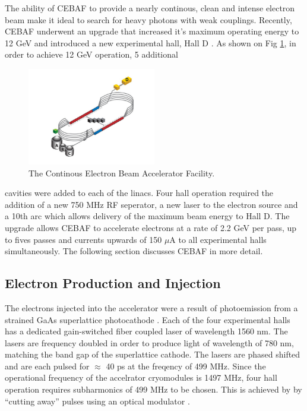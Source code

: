 The ability of CEBAF to provide a nearly continous, clean and intense electron
beam make it ideal to search for heavy photons with weak couplings. Recently,
CEBAF underwent an upgrade that increased it's maximum operating energy to 12
GeV and introduced a new experimental hall, Hall D \cite{pac.2007.4440339}. As 
shown on Fig \ref{fig:cebaf}, in order to achieve 12 GeV operation, 5 additional
\begin{figure}[h]
    \centering
    \includegraphics[width=0.5\textwidth]{images/cebaf.jpg}
    \caption{The Continous Electron Beam Accelerator Facility.}
    \label{fig:cebaf}
\end{figure}
cavities were added to each of the linacs.  Four hall operation required the 
addition of a new 750 MHz RF seperator, a new laser to the electron source and a
10th arc which allows delivery of the maximum beam energy to Hall D.  The 
upgrade allows CEBAF to accelerate electrons at a rate of 2.2 GeV per pass, up 
to fives passes and currents upwards of 150 $\mu$A to all experimental halls 
simultaneously.  The following section discusses CEBAF in more detail.


\subsection{Electron Production and Injection}

The electrons injected into the accelerator were a result of photoemission from
a strained GaAs superlattice photocathode \cite{APL.2004.85.13}.  Each of the 
four experimental halls has a dedicated gain-switched fiber coupled laser of
wavelength 1560 nm.  The lasers are frequency doubled in order to produce light
of wavelength of 780 nm, matching the band gap of the superlattice cathode. The
lasers are phased shifted and are each pulsed for $\approx$ 40 ps at the 
freqency of 499 MHz.  Since the operational frequency of the accelrator 
cryomodules is 1497 MHz, four hall operation requires subharmonics of 499 MHz to
be chosen.  This is achieved by by ``cutting away'' pulses using an optical 
modulator \cite{kazimi2013source}.



